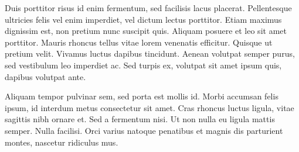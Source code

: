 \documentclass[twocolumn]{article}
\begin{document}
	Duis porttitor risus id enim fermentum, sed facilisis lacus placerat. Pellentesque ultricies felis vel enim imperdiet, vel dictum lectus porttitor. Etiam maximus dignissim est, non pretium nunc suscipit quis. Aliquam posuere et leo sit amet porttitor. Mauris rhoncus tellus vitae lorem venenatis efficitur. Quisque ut pretium velit. Vivamus luctus dapibus tincidunt. Aenean volutpat semper purus, sed vestibulum leo imperdiet ac. Sed turpis ex, volutpat sit amet ipsum quis, dapibus volutpat ante.
	
	Aliquam tempor pulvinar sem, sed porta est mollis id. Morbi accumsan felis ipsum, id interdum metus consectetur sit amet. Cras rhoncus luctus ligula, vitae sagittis nibh ornare et. Sed a fermentum nisi. Ut non nulla eu ligula mattis semper. Nulla facilisi. Orci varius natoque penatibus et magnis dis parturient montes, nascetur ridiculus mus.
\end{document}
